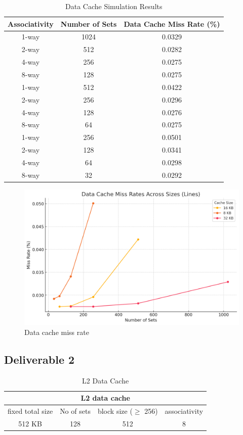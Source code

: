 \documentclass{article}
\begin{document}
\begin{table}[h!]
	\centering
	\begin{tabular}{ccc}
		\toprule
		\textbf{Associativity} & \textbf{Number of Sets} & \textbf{Data Cache Miss Rate (\%)} \\
		\midrule
		1-way  & 1024 &    0.0329\\
		2-way  & 512  &    0.0282\\
		4-way  & 256  &    0.0275\\
		8-way  & 128  &    0.0275\\
		\midrule
		1-way  & 512  &    0.0422\\
		2-way  & 256  &    0.0296\\
		4-way  & 128  &   0.0276\\
		8-way  & 64   &   0.0275\\
		\midrule
		1-way  & 256  &    0.0501\\
		2-way  & 128  &    0.0341\\
		4-way  & 64   &    0.0298\\
		8-way  & 32   &    0.0292\\
		\bottomrule
	\end{tabular}
	\caption{Data Cache Simulation Results}
\end{table}
\begin{figure}[H]
	\centering
	\includegraphics[scale=0.5]{deliv_data.png}
	\caption{Data cache miss rate}
	\label{fig:Data Cache Results}
\end{figure}
\newpage
\subsection{Deliverable 2}
\begin{table}[h!]
	\centering
	\begin{tabular}{|c|c|c|c|}
		\hline
		\multicolumn{4}{|c|}{L2 data cache} \\
		\hline
		fixed total size & No of sets & block size ($\geq$ 256) & associativity \\
		\hline
		512 KB & 128 & 512 & 8\\
		\hline
	\end{tabular}
	\caption{L2 Data Cache}
\end{table}
\end{document}
